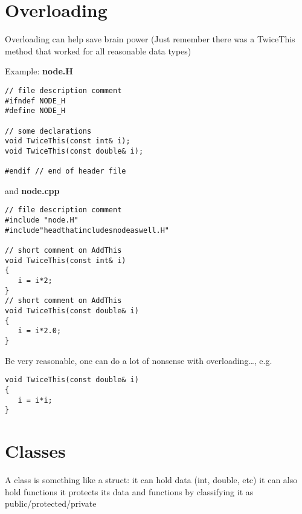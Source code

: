 \section{Overloading}
Overloading can help save brain power
(Just remember there was a TwiceThis method
that worked for all reasonable data
types)

Example: \textbf{node.H}\\
\begin{boxedminipage}{\linewidth}
\begin{verbatim}
// file description comment
#ifndef NODE_H
#define NODE_H

// some declarations
void TwiceThis(const int& i);
void TwiceThis(const double& i);

#endif // end of header file
\end{verbatim}
\end{boxedminipage}
and \textbf{node.cpp}\\
\begin{boxedminipage}{\linewidth}
\begin{verbatim}
// file description comment
#include "node.H"
#include"headthatincludesnodeaswell.H"

// short comment on AddThis
void TwiceThis(const int& i)
{
   i = i*2;
}
// short comment on AddThis
void TwiceThis(const double& i)
{
   i = i*2.0;
}
\end{verbatim}
\end{boxedminipage}
Be very reasonable, one can do a lot
of nonsense with overloading\ldots, e.g.\\
\begin{boxedminipage}{\linewidth}
\begin{verbatim}
void TwiceThis(const double& i)
{
   i = i*i;
}
\end{verbatim}
\end{boxedminipage}

\section{Classes}
A class is something like a struct:
it can hold data (int, double, etc)
it can also hold functions
it protects its data and functions by
classifying it as public/protected/private


